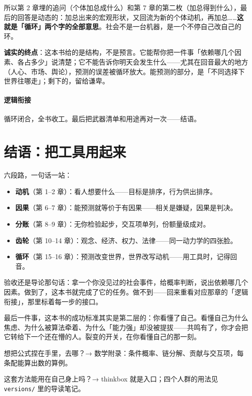 \documentclass[../../main2.tex]{subfiles}
\begin{document}
所以第 2 章埋的追问（个体加总成什么）和第 7 章的第二枚（加总得到什么），最后的回答是动态的：加总出来的宏观形状，又回流为新的个体动机，再加总……\textbf{这就是「循环」两个字的全部意思}。社会不是一台机器，是一个不停自己改自己的环。

\begin{warningbox}
	\textbf{诚实的终点}：这本书给的是结构，不是预言。它能帮你把一件事「依赖哪几个因素、各占多少」说清楚；它不能告诉你明天会发生什么——尤其在回音最大的地方（人心、市场、舆论），预测的误差被循环放大。能预测的部分，是「不同选择下世界往哪走」；剩下的，留给谦卑。
\end{warningbox}

\paragraph*{逻辑衔接}
	循环闭合，全书收工。最后把武器清单和用途再对一次——结语。

\section{结语：把工具用起来}

六段路，一句话一站：

\begin{itemize}
	\item \textbf{动机}（第 1–2 章）：看人想要什么——目标是排序，行为供出排序。
	\item \textbf{因果}（第 6–7 章）：能预测就等价于有因果——相关是嫌疑，因果是判决。
	\item \textbf{分账}（第 8–9 章）：无你检验起步，交互项单列，份额量级成对。
	\item \textbf{齿轮}（第 10–14 章）：观念、经济、权力、法律——同一动力学的四张脸。
	\item \textbf{循环}（第 15–16 章）：预测改变世界，世界改写动机——用工具时，记得回音。
\end{itemize}

验收还是导论那句话：拿一个你没见过的社会事件，给概率判断，说出依赖哪几个因素。做到了，这本书就完成了它的任务。做不到——回来重看对应那章的「逻辑衔接」，那里标着每一步的接口。

最后一件事，这本书的成功标准其实是第二层的：你看懂了自己。看懂自己为什么焦虑、为什么被算法牵着、为什么「能力强」却没被提拔——共鸣有了，你才会把它转给下一个还在懵的人。裂变的开关，在你看懂自己的那一刻。

\begin{reader_anticipation}
	\item 想把公式捏在手里，去哪？→ 数学附录：条件概率、链分解、贡献与交互项，每条配能算出数的算例。
	\item 这套方法能用在自己身上吗？→ thinkbox 就是入口；四个人群的用法见 \texttt{versions/} 里的导读笔记。
\end{reader_anticipation}
\end{document}
